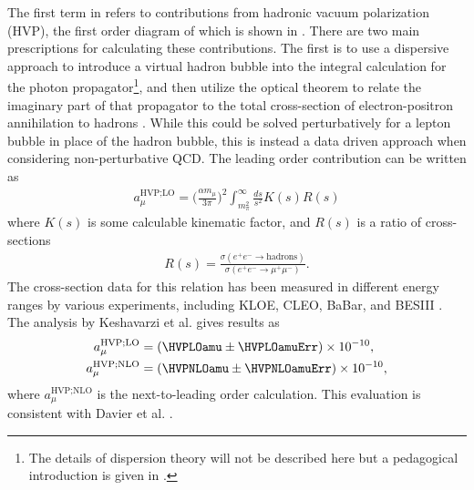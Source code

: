 The first term in  refers to contributions from hadronic vacuum polarization (HVP), the first order diagram of which is shown in . There are two main prescriptions for calculating these contributions. The first is to use a dispersive approach to introduce a virtual hadron bubble into the integral calculation for the photon propagator\footnote{The details of dispersion theory will not be described here but a pedagogical introduction is given in .}, and then utilize the optical theorem to relate the imaginary part of that propagator to the total cross-section of electron-positron annihilation to hadrons \cite{Jeger}. While this could be solved perturbatively for a lepton bubble in place of the hadron bubble, this is instead a data driven approach when considering non-perturbative QCD. The leading order contribution can be written as 
		\begin{align}
            a_{\mu}^{\text{HVP;LO}} = \Big(\frac{\alpha m_{\mu}}{3\pi}\Big)^{2} \int_{m_{\pi}^{2}}^{\infty} \frac{ds}{s^{2}} K(s) R(s)
		\end{align}
where $K(s)$ is some calculable kinematic factor, and $R(s)$ is a ratio of cross-sections
		\begin{align}
            R(s) = \frac{\sigma(e^{+}e^{-} \rightarrow \text{hadrons})}{\sigma(e^{+}e^{-} \rightarrow \mu^{+}\mu^{-})}.
		\end{align}
The cross-section data for this relation has been measured in different energy ranges by various experiments, including KLOE, CLEO, BaBar, and BESIII \cite{KLOE,CLEO,BaBar,BESIII}. The analysis by Keshavarzi et al. \cite{Keshavarzi:2018mgv} gives results as 
		\begin{equation}
		\begin{aligned}
            a_{\mu}^{\text{HVP;LO}} &= (\HVPLOamu \pm \HVPLOamuErr) \times 10^{-10}, \\
            a_{\mu}^{\text{HVP;NLO}} &= (\HVPNLOamu \pm \HVPNLOamuErr) \times 10^{-10}, 
		\end{aligned}
		\end{equation}
where $a_{\mu}^{\text{HVP;NLO}}$ is the next-to-leading order calculation. This evaluation is consistent with Davier et al. \cite{HVP2}.


